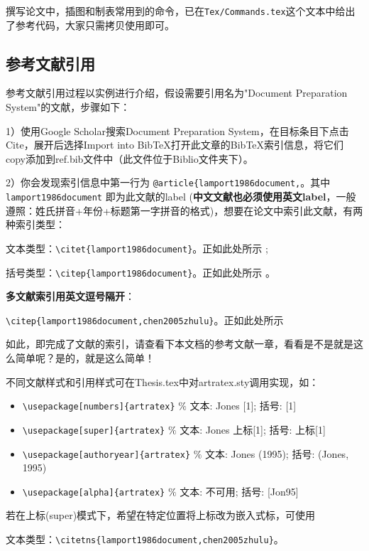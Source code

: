 撰写论文中，插图和制表常用到的命令，已在\verb|Tex/Commands.tex|这个文本中给出了参考代码，大家只需拷贝使用即可。

\subsection{参考文献引用}

参考文献引用过程以实例进行介绍，假设需要引用名为"Document Preparation System"的文献，步骤如下：

1）使用Google Scholar搜索Document Preparation System，在目标条目下点击Cite，展开后选择Import into BibTeX打开此文章的BibTeX索引信息，将它们copy添加到ref.bib文件中（此文件位于Biblio文件夹下）。

2）你会发现索引信息中第一行为 \verb|@article{lamport1986document,|。其中 \verb|lamport1986document| 即为此文献的label (\textbf{中文文献也必须使用英文label}，一般遵照：姓氏拼音+年份+标题第一字拼音的格式)，想要在论文中索引此文献，有两种索引类型：

文本类型：\verb|\citet{lamport1986document}|。正如此处所示 \citet{lamport1986document}; 

括号类型：\verb|\citep{lamport1986document}|。正如此处所示 \citep{lamport1986document}。

\textbf{多文献索引用英文逗号隔开}：

\verb|\citep{lamport1986document,chen2005zhulu}|。正如此处所示 \citep{lamport1986document,chen2005zhulu}

如此，即完成了文献的索引，请查看下本文档的参考文献一章，看看是不是就是这么简单呢？是的，就是这么简单！

不同文献样式和引用样式可在Thesis.tex中对artratex.sty调用实现，如：
\begin{itemize}
    \footnotesize
    \item \verb+\usepackage[numbers]{artratex}+ $\%$ 文本: Jones [1]; 括号: [1]
    \item \verb+\usepackage[super]{artratex}+ $\%$ 文本: Jones 上标[1]; 括号: 上标[1]
    \item \verb+\usepackage[authoryear]{artratex}+ $\%$ 文本: Jones (1995); 括号: (Jones, 1995)
    \item \verb+\usepackage[alpha]{artratex}+ $\%$ 文本: 不可用; 括号: [Jon95]
\end{itemize}

若在上标(super)模式下，希望在特定位置将上标改为嵌入式标，可使用

文本类型：\verb|\citetns{lamport1986document,chen2005zhulu}|。

